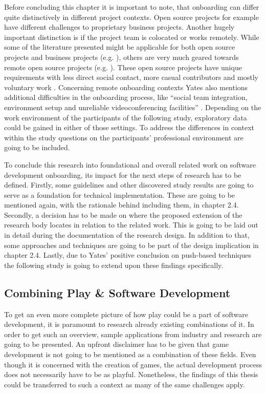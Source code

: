 Before concluding this chapter it is important to note, that onboarding can differ quite distinctively in different project contexts. Open source projects for example have different challenges to proprietary business projects. Another hugely important distinction is if the project team is colocated or works remotely. While some of the literature presented might be applicable for both open source projects and business projects (e.g. \cite{dagenais2010moving}), others are very much geared towards remote open source projects (e.g. \cite{steinmacher2018let}). These open source projects have unique requirements with less direct social contact, more casual contributors and mostly voluntary work \cite{steinmacher2018let}. Concerning remote onboarding contexts Yates also mentions additional difficulties in the onboarding process, like \enquote{social team integration, environment setup and unreliable videoconferencing facilities} \cite[p. 35]{yates2014onboarding}. Depending on the work environment of the participants of the following study, exploratory data could be gained in either of those settings. To address the differences in context within the study questions on the participants' professional environment are going to be included.

To conclude this research into foundational and overall related work on software development onboarding, its impact for the next steps of research has to be defined. Firstly, some guidelines and other discovered study results are going to serve as a foundation for technical implementation. These are going to be mentioned again, with the rationale behind including them, in chapter 2.4. Secondly, a decision has to be made on where the proposed extension of the research body locates in relation to the related work. This is going to be laid out in detail during the documentation of the research design. In addition to that, some approaches and techniques are going to be part of the design implication in chapter 2.4. Lastly, due to Yates' positive conclusion on push-based techniques \cite[p. 197]{yates2014onboarding} the following study is going to extend upon these findings specifically.

\subsection{Combining Play \& Software Development}

To get an even more complete picture of how play could be a part of software development, it is paramount to research already existing combinations of it. In order to get such an overview, sample applications from industry and research are going to be presented. An upfront disclaimer has to be given that game development is not going to be mentioned as a combination of these fields. Even though it is concerned with the creation of games, the actual development process does not necessarily have to be as playful. Nonetheless, the findings of this thesis could be transferred to such a context as many of the same challenges apply.

